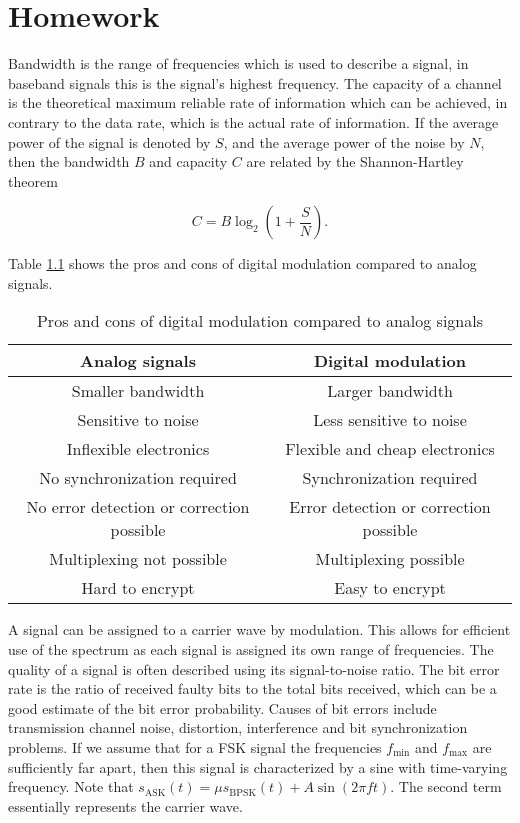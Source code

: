 \documentclass[11pt,titlepage]{report}
\begin{document}
\chapter{Homework}
Bandwidth is the range of frequencies which is used to describe a signal, in baseband signals this is the signal's highest frequency. The capacity of a channel is the  theoretical maximum reliable rate of information which can be achieved, in contrary to the data rate, which is the actual rate of information. If the average power of the signal is denoted by $S$, and the average power of the noise by $N$, then the bandwidth $B$ and capacity $C$ are related by the Shannon-Hartley theorem

\begin{equation}
	C=B \log_2{\left(1+\frac{S}{N}\right)}.
\end{equation}

Table \ref{tab:pros-cons} shows the pros and cons of digital modulation compared to analog signals.

\begin{table}[H]
	\centering
	\caption{Pros and cons of digital modulation compared to analog signals}
	\label{tab:pros-cons}
	\begin{tabular}{c c}
		\hline\hline
		Analog signals & Digital modulation \\
		\hline
		Smaller bandwidth & Larger bandwidth \\
		Sensitive to noise & Less sensitive to noise \\
		Inflexible electronics & Flexible and cheap electronics \\
		No synchronization required & Synchronization required \\
		No error detection or correction possible & Error detection or correction possible \\
		Multiplexing not possible & Multiplexing possible \\
		Hard to encrypt & Easy to encrypt \\
		\hline
	\end{tabular}
\end{table}

A signal can be assigned to a carrier wave by modulation. This allows for efficient use of the spectrum as each signal is assigned its own range of frequencies. The quality of a signal is often described using its signal-to-noise ratio. The bit error rate is the ratio of received faulty bits to the total bits received, which can be a good estimate of the bit error probability. Causes of bit errors include transmission channel noise, distortion, interference and bit synchronization problems. If we assume that for a FSK signal the frequencies $f_{\text{min}}$ and $f_{\text{max}}$ are sufficiently far apart, then this signal is characterized by a sine with time-varying frequency. Note that $s_{\text{ASK}}(t) = \mu s_{\text{BPSK}}(t) + A \sin{(2 \pi f t)}$. The second term essentially represents the carrier wave.
\end{document}
